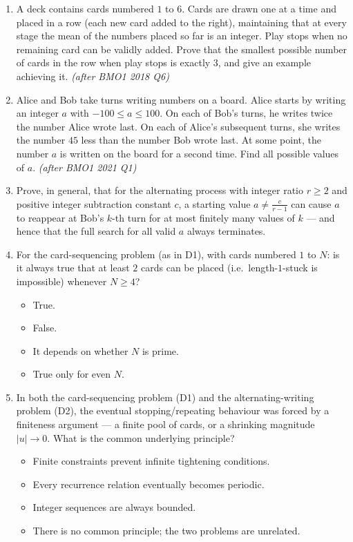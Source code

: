 \documentclass[11pt,a4paper]{article}
\begin{document}
\begin{enumerate}

\item A deck contains cards numbered $1$ to $6$. Cards are drawn one at a time and placed in a row (each new card added to the right), maintaining that at every stage the mean of the numbers placed so far is an integer. Play stops when no remaining card can be validly added. Prove that the smallest possible number of cards in the row when play stops is exactly $3$, and give an example achieving it. \textit{\small(after BMO1 2018 Q6)}

\item Alice and Bob take turns writing numbers on a board. Alice starts by writing an integer $a$ with $-100\leq a\leq100$. On each of Bob's turns, he writes twice the number Alice wrote last. On each of Alice's subsequent turns, she writes the number $45$ less than the number Bob wrote last. At some point, the number $a$ is written on the board for a second time. Find all possible values of $a$. \textit{\small(after BMO1 2021 Q1)}

\item Prove, in general, that for the alternating process with integer ratio $r\geq2$ and positive integer subtraction constant $c$, a starting value $a\neq\frac c{r-1}$ can cause $a$ to reappear at Bob's $k$-th turn for at most finitely many values of $k$ --- and hence that the full search for all valid $a$ always terminates.

\item For the card-sequencing problem (as in D1), with cards numbered $1$ to $N$: is it always true that at least $2$ cards can be placed (i.e.\ length-$1$-stuck is impossible) whenever $N\geq4$?
\begin{itemize}
\item[A)] True.
\item[B)] False.
\item[C)] It depends on whether $N$ is prime.
\item[D)] True only for even $N$.
\end{itemize}

\item In both the card-sequencing problem (D1) and the alternating-writing problem (D2), the eventual stopping/repeating behaviour was forced by a finiteness argument --- a finite pool of cards, or a shrinking magnitude $|u|\to0$. What is the common underlying principle?
\begin{itemize}
\item[A)] Finite constraints prevent infinite tightening conditions.
\item[B)] Every recurrence relation eventually becomes periodic.
\item[C)] Integer sequences are always bounded.
\item[D)] There is no common principle; the two problems are unrelated.
\end{itemize}

\end{enumerate}

\end{document}
